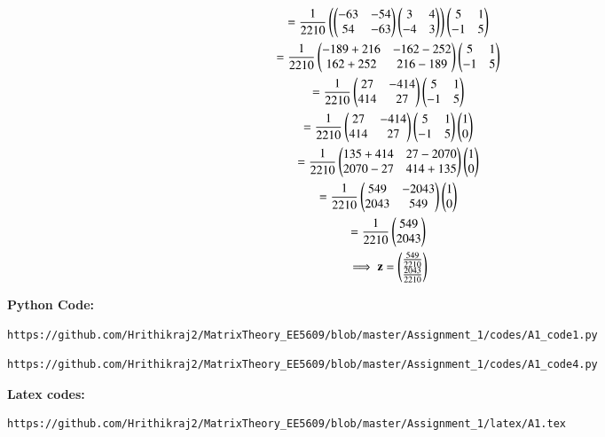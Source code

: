 \documentclass[journal,12pt,twocolumn]{IEEEtran}
\begin{document}
\begin{multline}
 = \frac{1}{2210}\left(\begin{pmatrix}-63 & -54 \\ 54 & -63\end{pmatrix} \begin{pmatrix}3 & 4 \\-4 & 3\end{pmatrix}\right) \begin{pmatrix}5 & 1 \\ -1 & 5\end{pmatrix}\\
 = \frac{1}{2210}\begin{pmatrix}-189+216 & -162-252 \\ 162+252 & 216-189\end{pmatrix}\begin{pmatrix}5 & 1 \\ -1 & 5\end{pmatrix}\\
 =\frac{1}{2210}\begin{pmatrix}27 & -414 \\ 414 & 27\end{pmatrix}\begin{pmatrix}5 & 1 \\ -1 & 5\end{pmatrix}\\
 =\frac{1}{2210}\begin{pmatrix} 27 & -414 \\  414 & 27\end{pmatrix} \begin{pmatrix}5 & 1 \\ -1 & 5\end{pmatrix}\begin{pmatrix}1 \\ 0\end{pmatrix}\\
 =\frac{1}{2210}\begin{pmatrix}135+414 & 27-2070 \\ 2070-27 & 414+135\end{pmatrix}\begin{pmatrix}1 \\ 0\end{pmatrix}\\
 =\frac{1}{2210}\begin{pmatrix}549 & -2043 \\ 2043 & 549\end{pmatrix}\begin{pmatrix}1 \\ 0\end{pmatrix}\\
 =\frac{1}{2210}\begin{pmatrix}549 \\ 2043\end{pmatrix}\\
 \implies\mathbf{z} = \begin{pmatrix}\frac{549}{2210} \\ \frac{2043}{2210}\end{pmatrix}
\end{multline}

\textbf{Python Code:}
\begin{lstlisting}
https://github.com/Hrithikraj2/MatrixTheory_EE5609/blob/master/Assignment_1/codes/A1_code1.py
\end{lstlisting}
\begin{lstlisting}
https://github.com/Hrithikraj2/MatrixTheory_EE5609/blob/master/Assignment_1/codes/A1_code4.py
\end{lstlisting}
\textbf{Latex codes:}
\begin{lstlisting}
https://github.com/Hrithikraj2/MatrixTheory_EE5609/blob/master/Assignment_1/latex/A1.tex
\end{lstlisting}
\end{document}
